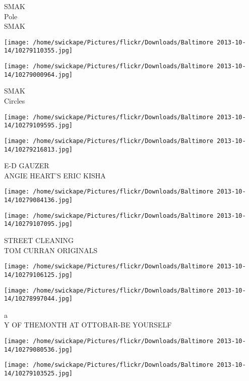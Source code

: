 \documentclass[10pt,letterpaper]{article}
\begin{document}
SMAK\\
Pole\\
SMAK\\
\pagebreak

\texttt{[image: /home/swickape/Pictures/flickr/Downloads/Baltimore 2013-10-14/10279110355.jpg]}

\vspace{0.25in}
\texttt{[image: /home/swickape/Pictures/flickr/Downloads/Baltimore 2013-10-14/10279000964.jpg]}

SMAK\\
Circles\\
\pagebreak

\texttt{[image: /home/swickape/Pictures/flickr/Downloads/Baltimore 2013-10-14/10279109595.jpg]}

\vspace{0.25in}
\texttt{[image: /home/swickape/Pictures/flickr/Downloads/Baltimore 2013-10-14/10279216813.jpg]}

E{-}D GAUZER\\
ANGIE HEART'S ERIC KISHA\\
\pagebreak

\texttt{[image: /home/swickape/Pictures/flickr/Downloads/Baltimore 2013-10-14/10279084136.jpg]}

\vspace{0.25in}
\texttt{[image: /home/swickape/Pictures/flickr/Downloads/Baltimore 2013-10-14/10279107095.jpg]}

STREET CLEANING\\
TOM CURRAN ORIGINALS\\
\pagebreak

\texttt{[image: /home/swickape/Pictures/flickr/Downloads/Baltimore 2013-10-14/10279106125.jpg]}

\vspace{0.25in}
\texttt{[image: /home/swickape/Pictures/flickr/Downloads/Baltimore 2013-10-14/10278997044.jpg]}

a\\
Y OF THEMONTH AT OTTOBAR{-}BE YOURSELF\\
\pagebreak

\texttt{[image: /home/swickape/Pictures/flickr/Downloads/Baltimore 2013-10-14/10279080536.jpg]}

\vspace{0.25in}
\texttt{[image: /home/swickape/Pictures/flickr/Downloads/Baltimore 2013-10-14/10279103525.jpg]}
\end{document}
